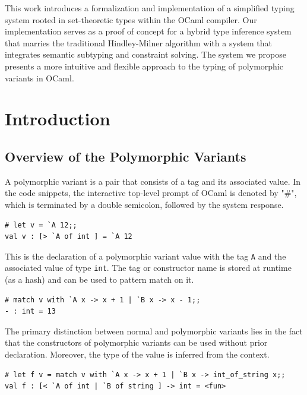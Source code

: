 \documentclass[a4paper,11pt,oneside]{article}
\theoremstyle{definition}
\begin{document}
This work introduces a formalization and implementation of a simplified typing system rooted in set-theoretic types within the OCaml compiler. Our implementation serves as a proof of concept for a hybrid type inference system that marries the traditional Hindley-Milner algorithm with a system that integrates semantic subtyping and constraint solving. The system we propose presents a more intuitive and flexible approach to the typing of polymorphic variants in OCaml.

\newpage
\tableofcontents

\clearpage
{}

\section{Introduction}

\subsection{Overview of the Polymorphic Variants}

A polymorphic variant is a pair that consists of a tag and its associated value. In the code snippets, the interactive top-level prompt of OCaml is denoted by "\#", which is terminated by a double semicolon, followed by the system response.

  {\ttfamily\begin{verbatim}
# let v = `A 12;;
val v : [> `A of int ] = `A 12
\end{verbatim}}

This is the declaration of a polymorphic variant value with the tag \texttt{A} and the associated value of type \texttt{int}. The tag or constructor name is stored at runtime (as a hash) and can be used to pattern match on it.

  {\ttfamily\begin{verbatim}
# match v with `A x -> x + 1 | `B x -> x - 1;;
- : int = 13
\end{verbatim}}

The primary distinction between normal and polymorphic variants lies in the fact that the constructors of polymorphic variants can be used without prior declaration. Moreover, the type of the value is inferred from the context.

  {\ttfamily\begin{verbatim}
# let f v = match v with `A x -> x + 1 | `B x -> int_of_string x;;
val f : [< `A of int | `B of string ] -> int = <fun>
\end{verbatim}}
\end{document}
